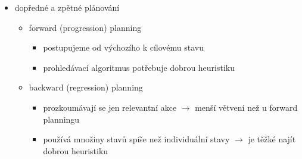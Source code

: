 \begin{itemize}
\begin{itemize}
\begin{itemize}
\item plán je posloupnost akcí
\end{itemize}
\item plánování je realizováno prohledáváním stavového prostoru
\begin{itemize}
\item ten je mnohdy dost velký
\end{itemize}
\end{itemize}
\item dopředné a zpětné plánování
\begin{itemize}
\item forward (progression) planning
\begin{itemize}
\item postupujeme od výchozího k cílovému stavu
\item prohledávací algoritmus potřebuje dobrou heuristiku
\end{itemize}
\item backward (regression) planning
\begin{itemize}
\item prozkoumávají se jen relevantní akce $\to$ menší větvení než u forward planningu
\item používá množiny stavů spíše než individuální stavy $\to$ je těžké najít dobrou heuristiku
\end{itemize}
\end{itemize}
\end{itemize}
